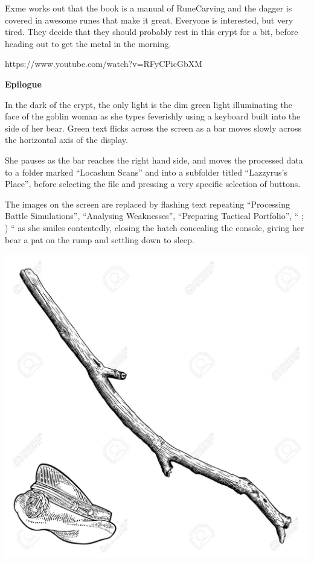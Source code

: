 \begin{multicols}{2}
Exme works out that the book is a manual of RuneCarving and the dagger is covered in awesome runes that make it great. Everyone is interested, but very tired. They decide that they should probably rest in this crypt for a bit, before heading out to get the metal in the morning. \medskip

https://www.youtube.com/watch?v=RFyCPicGbXM\medskip

\textbf{Epilogue}\medskip

In the dark of the crypt, the only light is the dim green light illuminating the face of the goblin woman as she types feverishly using a keyboard built into the side of her bear. Green text flicks across the screen as a bar moves slowly across the horizontal axis of the display.\medskip

She pauses as the bar reaches the right hand side, and moves the processed data to a folder marked “Locashun Scans” and into a subfolder titled “Lazzyrus’s Place”, before selecting the file and pressing a very specific selection of buttons.\medskip

The images on the screen are replaced by flashing text repeating “Processing Battle Simulations”, “Analysing Weaknesses”, “Preparing Tactical Portfolio”, “ ; ) “ as she smiles contentedly, closing the hatch concealing the console, giving her bear a pat on the rump and settling down to sleep.\medskip



\end{multicols}

\vspace*{5mm}

\begin{center}
\includegraphics[width=\textwidth]{./content/img/xxx.jpg}
\begin{figure}[h]
\end{figure}
\end{center}

\clearpage